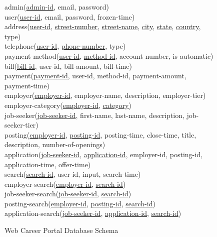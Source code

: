 \documentclass{article}
\begin{document}
        \begin{figure}[h]
            \begin{em}
                admin(\underline{admin-id}, email, password) \\
                user(\underline{user-id}, email, password, frozen-time) \\
                address(\underline{user-id}, \underline{street-number}, \underline{street-name}, \underline{city},
                \underline{state}, \underline{country}, type) \\
                telephone(\underline{user-id}, \underline{phone-number}, type) \\
                payment-method(\underline{user-id}, \underline{method-id}, account number, is-automatic) \\
                bill(\underline{bill-id}, user-id, bill-amount, bill-time) \\
                payment(\underline{payment-id}, user-id, method-id, payment-amount, payment-time) \\
                employer(\underline{employer-id}, employer-name, description, employer-tier) \\
                employer-category(\underline{employer-id}, \underline{category}) \\
                job-seeker(\underline{job-seeker-id}, first-name, last-name, description, job-seeker-tier) \\
                posting(\underline{employer-id}, \underline{posting-id}, posting-time, close-time, title, description,
                number-of-openings) \\
                application(\underline{job-seeker-id}, \underline{application-id}, employer-id, posting-id,
                application-time, offer-time) \\
                search(\underline{search-id}, user-id, input, search-time) \\
                employer-search(\underline{employer-id}, \underline{search-id}) \\
                job-seeker-search(\underline{job-seeker-id}, \underline{search-id}) \\
                posting-search(\underline{employer-id}, \underline{posting-id}, \underline{search-id}) \\
                application-search(\underline{job-seeker-id}, \underline{application-id}, \underline{search-id})
            \end{em}
            \caption{Web Career Portal Database Schema}
            \label{fig:schema}
        \end{figure}
\end{document}
